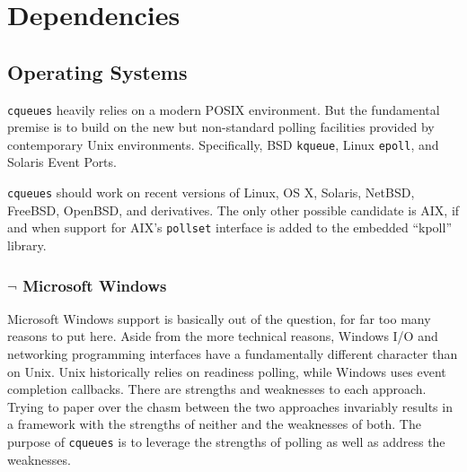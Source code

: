 \documentclass[11pt, oneside]{memoir}
\newcommand*{\cqueues}[0]{\texttt{cqueues}\xspace}
\newcommand*{\syscall}[1]{\texttt{#1}\xspace}
\begin{document}
\date{\today}
\author{William Ahern}
\maketitle
\thispagestyle{empty}
\clearpage

\setcounter{page}{1}
\tableofcontents

\clearpage

\setcounter{page}{1}


\chapter{Dependencies}

\section{Operating Systems}

\cqueues heavily relies on a modern POSIX environment. But the fundamental premise is to build on the new but non-standard polling facilities provided by contemporary Unix environments. Specifically, BSD \syscall{kqueue}, Linux \syscall{epoll}, and Solaris Event Ports.

\cqueues should work on recent versions of Linux, OS X, Solaris, NetBSD, FreeBSD, OpenBSD, and derivatives. The only other possible candidate is AIX, if and when support for AIX's \syscall{pollset} interface is added to the embedded ``kpoll'' library.

\subsection{$\lnot$ Microsoft Windows}

Microsoft Windows support is basically out of the question, for far too many reasons to put here. Aside from the more technical reasons, Windows I/O and networking programming interfaces have a fundamentally different character than on Unix. Unix historically relies on readiness polling, while Windows uses event completion callbacks. There are strengths and weaknesses to each approach. Trying to paper over the chasm between the two approaches invariably results in a framework with the strengths of neither and the weaknesses of both. The purpose of \cqueues is to leverage the strengths of polling as well as address the weaknesses.
\end{document}
